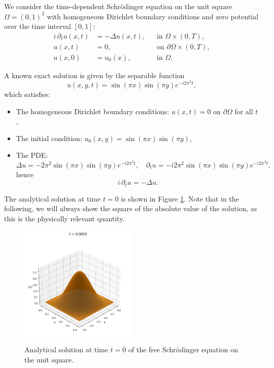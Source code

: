 \documentclass{article}
\theoremstyle{definition}
\theoremstyle{plain}
\theoremstyle{remark}
\begin{document}
We consider the time-dependent Schrödinger equation on the unit square $\Omega = (0,1)^2$ with homogeneous Dirichlet boundary conditions and zero potential over the time interval $[0,1]$:
\begin{align*}
i \, \partial_t u(x,t) &= -\Delta u(x,t), &&\text{in } \Omega \times (0,T), \\
u(x,t) &= 0, &&\text{on } \partial \Omega \times (0,T), \\
u(x,0) &= u_0(x), &&\text{in } \Omega.
\end{align*}

A known exact solution is given by the separable function
\[
u(x,y,t) = \sin(\pi x)\sin(\pi y) e^{-i 2\pi^2 t},
\]
which satisfies:
\begin{itemize}
  \item The homogeneous Dirichlet boundary conditions: $u(x,t) = 0$ on $\partial \Omega$ for all $t$,
  \item The initial condition: $u_0(x,y) = \sin(\pi x)\sin(\pi y)$,
  \item The PDE:
  \[
  \Delta u = -2\pi^2 \sin(\pi x)\sin(\pi y) e^{-i 2\pi^2 t}, \quad
  \partial_t u = -i 2\pi^2 \sin(\pi x)\sin(\pi y) e^{-i 2\pi^2 t},
  \]
  hence
  \[
  i \, \partial_t u = -\Delta u.
  \]
\end{itemize}

The analytical solution at time $t = 0$ is shown in Figure \ref{fig:initial_state}. Note that in the following, we will always show the square of the absolute value of the solution, as this is the physically relevant quantity.

\begin{figure}[h!]
  \centering
  \includegraphics[width=0.5\textwidth, trim=0cm 0cm 0cm 1cm, clip]{figures/initial_state_3d.png}
  \caption{Analytical solution at time $t = 0$ of the free Schrödinger equation on the unit square.}
  \label{fig:initial_state}
\end{figure}
\end{document}
